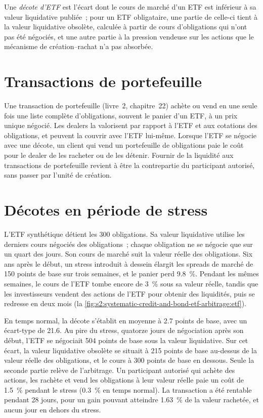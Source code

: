 \begin{definition}\label{def:s2:systematic-credit-and-bond-etf-arbitrage:discount}
Une \emph{décote d'ETF} est l'écart dont le cours de marché d'un ETF est inférieur à sa valeur liquidative publiée~; pour un ETF obligataire, une partie
de celle-ci tient à la valeur liquidative obsolète, calculée à partir de cours d'obligations qui n'ont pas été négociés, et une autre partie à la pression vendeuse sur les actions que le mécanisme de création--rachat n'a pas
absorbée.
\end{definition}

\section{Transactions de portefeuille}

Une transaction de portefeuille (livre~2, chapitre~22) achète ou vend en une seule fois une liste complète d'obligations, souvent le panier d'un ETF, à un prix unique négocié. Les dealers
la valorisent par rapport à l'ETF et aux cotations des obligations, et peuvent la couvrir avec l'ETF lui-même. Lorsque l'ETF se négocie avec une décote, un client qui vend un portefeuille de
obligations paie le coût pour le dealer de les racheter ou de les détenir. Fournir de la liquidité aux transactions de portefeuille revient à être la contrepartie du participant
autorisé, sans passer par l'unité de création.

\section{Décotes en période de stress}

L'ETF synthétique détient les 300 obligations. Sa valeur liquidative utilise les derniers cours négociés des obligations~; chaque obligation ne se négocie que sur un quart des jours. Son cours de marché suit la
valeur réelle des obligations. Six ans après le début, un stress introduit à dessein élargit les spreads de marché de 150 points de base sur trois semaines, et le panier perd 9.8~\%. Pendant les mêmes
semaines, le cours de l'ETF tombe encore de 3~\% sous sa valeur réelle, tandis que les investisseurs vendent des actions de l'ETF pour obtenir des liquidités, puis se redresse
en deux mois (la \cref{fig:s2:systematic-credit-and-bond-etf-arbitrage:etf}).

En temps normal, la décote s'établit en moyenne à 2.7 points de base, avec un écart-type de 21.6. Au pire du stress, quatorze jours de négociation après son début, l'ETF se négociait
504 points de base sous la valeur liquidative. Sur cet écart, la valeur liquidative obsolète se situait à 215 points de base au-dessus de la valeur réelle des obligations, et le cours à 300 points de base en dessous.
Seule la seconde partie relève de l'arbitrage. Un participant autorisé qui achète des actions, les rachète et vend les obligations à leur valeur réelle paie un coût de
1.5~\% pendant le stress (0.3~\% en temps normal). La transaction a été rentable pendant 28 jours, pour un gain pouvant atteindre 1.63~\% de la valeur rachetée, et aucun jour en dehors du stress.


